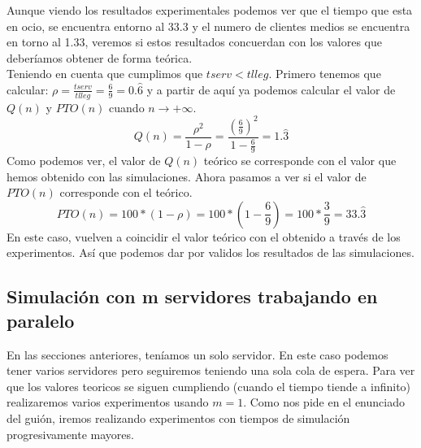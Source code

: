 \documentclass[12pt,a4paper]{article}
\begin{document}
Aunque viendo los resultados experimentales podemos ver que el tiempo que esta en ocio, se encuentra entorno al 33.3 y el numero de clientes medios se encuentra en torno al 1.33, veremos si estos resultados concuerdan con los valores que deberíamos obtener de forma teórica. \\
Teniendo en cuenta que cumplimos que $tserv<tlleg$. Primero tenemos que calcular: $\rho=\frac{ tserv }{tlleg }=\frac{6}{9}=0 . \widehat{6}$ y a partir de aquí ya podemos calcular el valor de $Q(n)$ y $PTO(n)$ cuando $n\rightarrow+\infty$.
$$Q(n) = \frac{\rho^2}{1-\rho}=\frac{(\frac{6}{9})^2}{1-\frac{6}{9}}=1.\widehat{3}$$
Como podemos ver, el valor de $Q(n)$ teórico se corresponde con el valor que hemos obtenido con las simulaciones. Ahora pasamos a ver si el valor de $PTO(n)$ corresponde con el teórico.
$$PTO(n)=100*(1-\rho)=100*(1-\frac{6}{9})=100*\frac{3}{9} =33.\widehat{3}$$
En este caso, vuelven a coincidir  el valor teórico con el obtenido a través de los experimentos. Así que podemos dar por validos los resultados de las simulaciones.
\subsection{Simulación con m servidores trabajando en paralelo}
En las secciones anteriores, teníamos un solo servidor. En este caso podemos tener varios servidores pero seguiremos teniendo una sola cola de espera. Para ver que los valores teoricos se siguen cumpliendo (cuando el tiempo tiende a infinito) realizaremos varios experimentos usando $m=1$. Como nos pide en el enunciado del guión, iremos realizando experimentos con tiempos de simulación progresivamente mayores.
\end{document}
